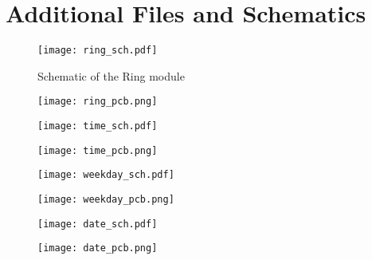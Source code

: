 \chapter{Additional Files and Schematics}

\begin{figure}[h!]
	\centering
	\texttt{[image: ring\_sch.pdf]}
	\caption{Schematic of the Ring module}
	\label{fig:ring_sch}
\end{figure}

\begin{figure}[h!]
	\centering
	\texttt{[image: ring\_pcb.png]}
	\caption{}
	\label{fig:ring_pcb}
\end{figure}
\begin{figure}[h!]
	\centering
	\texttt{[image: time\_sch.pdf]}
	\caption{}
	\label{fig:time_sch}
\end{figure}

\begin{figure}[h!]
	\centering
	\texttt{[image: time\_pcb.png]}
	\caption{}
	\label{fig:time_pcb}
\end{figure}
\begin{figure}[h!]
	\centering
	\texttt{[image: weekday\_sch.pdf]}
	\caption{}
	\label{fig:weekday_sch}
\end{figure}

\begin{figure}[h!]
	\centering
	\texttt{[image: weekday\_pcb.png]}
	\caption{}
	\label{fig:weekday_pcb}
\end{figure}
\begin{figure}[h!]
	\centering
	\texttt{[image: date\_sch.pdf]}
	\caption{}
	\label{fig:date_sch}
\end{figure}

\begin{figure}[h!]
	\centering
	\texttt{[image: date\_pcb.png]}
	\caption{}
	\label{fig:date_pcb}
\end{figure}
